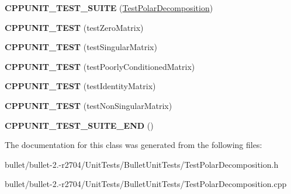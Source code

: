\begin{DoxyCompactItemize}
\item 
\hypertarget{class_test_polar_decomposition_a316c8425452b8947adb4cf5db3e518a9}{{\bfseries C\+P\+P\+U\+N\+I\+T\+\_\+\+T\+E\+S\+T\+\_\+\+S\+U\+I\+T\+E} (\hyperlink{class_test_polar_decomposition}{Test\+Polar\+Decomposition})}\label{class_test_polar_decomposition_a316c8425452b8947adb4cf5db3e518a9}

\item 
\hypertarget{class_test_polar_decomposition_a610f04a2d12dacd003ca0d2c69bcee67}{{\bfseries C\+P\+P\+U\+N\+I\+T\+\_\+\+T\+E\+S\+T} (test\+Zero\+Matrix)}\label{class_test_polar_decomposition_a610f04a2d12dacd003ca0d2c69bcee67}

\item 
\hypertarget{class_test_polar_decomposition_a022d4e60506d9f31e5d8c439709e0629}{{\bfseries C\+P\+P\+U\+N\+I\+T\+\_\+\+T\+E\+S\+T} (test\+Singular\+Matrix)}\label{class_test_polar_decomposition_a022d4e60506d9f31e5d8c439709e0629}

\item 
\hypertarget{class_test_polar_decomposition_a232188fe72e1f714a1770af0119a94f7}{{\bfseries C\+P\+P\+U\+N\+I\+T\+\_\+\+T\+E\+S\+T} (test\+Poorly\+Conditioned\+Matrix)}\label{class_test_polar_decomposition_a232188fe72e1f714a1770af0119a94f7}

\item 
\hypertarget{class_test_polar_decomposition_a62d2ff69630539ec7e8677e006fadd1c}{{\bfseries C\+P\+P\+U\+N\+I\+T\+\_\+\+T\+E\+S\+T} (test\+Identity\+Matrix)}\label{class_test_polar_decomposition_a62d2ff69630539ec7e8677e006fadd1c}

\item 
\hypertarget{class_test_polar_decomposition_a178fe175be6390a12ee1e8f4a9daa403}{{\bfseries C\+P\+P\+U\+N\+I\+T\+\_\+\+T\+E\+S\+T} (test\+Non\+Singular\+Matrix)}\label{class_test_polar_decomposition_a178fe175be6390a12ee1e8f4a9daa403}

\item 
\hypertarget{class_test_polar_decomposition_a14063a9d002dd1e3420aeaf023b514d3}{{\bfseries C\+P\+P\+U\+N\+I\+T\+\_\+\+T\+E\+S\+T\+\_\+\+S\+U\+I\+T\+E\+\_\+\+E\+N\+D} ()}\label{class_test_polar_decomposition_a14063a9d002dd1e3420aeaf023b514d3}

\end{DoxyCompactItemize}


The documentation for this class was generated from the following files\+:\begin{DoxyCompactItemize}
\item 
bullet/bullet-\/2.-\/r2704/\+Unit\+Tests/\+Bullet\+Unit\+Tests/Test\+Polar\+Decomposition.\+h\item 
bullet/bullet-\/2.-\/r2704/\+Unit\+Tests/\+Bullet\+Unit\+Tests/Test\+Polar\+Decomposition.\+cpp\end{DoxyCompactItemize}
